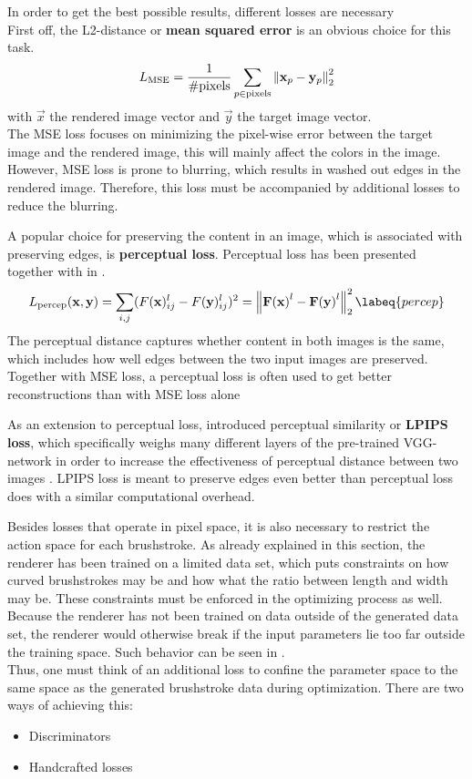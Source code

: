 In order to get the best possible results, different losses are necessary\\
First off, the L2-distance or \textbf{mean squared error} is an obvious choice for this task.
\begin{align}
    L_{\text{MSE}} = \frac{1}{\# \text{pixels}} \sum_{p \in \text{pixels}} \left\lVert\mathbf{x}_p - \mathbf{y}_p\right\rVert_2^2
\end{align}
with $\vec{x}$ the rendered image vector and $\vec{y}$ the target image vector.\\
The MSE loss focuses on minimizing the pixel-wise error between the target image and the rendered image, this will mainly affect the colors in the image.
However, MSE loss is prone to blurring, which results in washed out edges in the rendered image.
Therefore, this loss must be accompanied by additional losses to reduce the blurring.

A popular choice for preserving the content in an image, which is associated with preserving edges, is \textbf{perceptual loss}.
Perceptual loss has been presented together with  in .
\begin{align}
    L_{\text{percep}}(\vec{x}, \vec{y}) = \sum_{i, j} (F(\vec{x})_{ij}^l - F(\vec{y})_{ij}^l)^2 = \norm{\tensor{F(\vec{x})}^l - \tensor{F(\vec{y})}^l}_2^2
    \labeq{percep}
\end{align}
The perceptual distance captures whether content in both images is the same, which includes how well edges between the two input images are preserved.
Together with MSE loss, a perceptual loss is often used to get better reconstructions than with MSE loss alone

As an extension to perceptual loss, \citeauthor*{lpips} introduced perceptual similarity or \textbf{LPIPS loss}, which specifically weighs many different layers of the pre-trained VGG-network in order to increase the effectiveness of perceptual distance between two images \cite{lpips}.
LPIPS loss is meant to preserve edges even better than perceptual loss does with a similar computational overhead.

Besides losses that operate in pixel space, it is also necessary to restrict the action space for each brushstroke.
As already explained in this section, the renderer has been trained on a limited data set, which puts constraints on how curved brushstrokes may be and how what the ratio between length and width may be.
These constraints must be enforced in the optimizing process as well.\\
Because the renderer has not been trained on data outside of the generated data set, the renderer would otherwise break if the input parameters lie too far outside the training space.
Such behavior can be seen in .\\
Thus, one must think of an additional loss to confine the parameter space to the same space as the generated brushstroke data during optimization.
There are two ways of achieving this:
\begin{itemize}
    \item Discriminators
    \item Handcrafted losses
\end{itemize}

